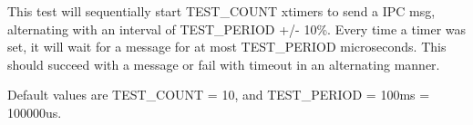 This test will sequentially start T\+E\+S\+T\+\_\+\+C\+O\+U\+NT xtimers to send a I\+PC msg, alternating with an interval of T\+E\+S\+T\+\_\+\+P\+E\+R\+I\+OD +/-\/ 10\%. Every time a timer was set, it will wait for a message for at most T\+E\+S\+T\+\_\+\+P\+E\+R\+I\+OD microseconds. This should succeed with a message or fail with timeout in an alternating manner.

Default values are T\+E\+S\+T\+\_\+\+C\+O\+U\+NT = 10, and T\+E\+S\+T\+\_\+\+P\+E\+R\+I\+OD = 100ms = 100000us. 